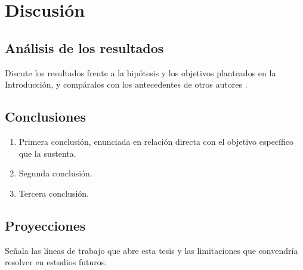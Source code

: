 %
%

\chapter{Discusión}

\section{Análisis de los resultados}

Discute los resultados frente a la hipótesis y los objetivos planteados en la
Introducción, y compáralos con los antecedentes de otros autores
\parencite{Dayton1984, Conover1980}.

\section{Conclusiones}

\begin{enumerate}[label=\arabic*., leftmargin=*, itemsep=0.3\baselineskip]
  \item Primera conclusión, enunciada en relación directa con el objetivo
        específico que la sustenta.
  \item Segunda conclusión.
  \item Tercera conclusión.
\end{enumerate}

\section{Proyecciones}

Señala las líneas de trabajo que abre esta tesis y las limitaciones que
convendría resolver en estudios futuros.

